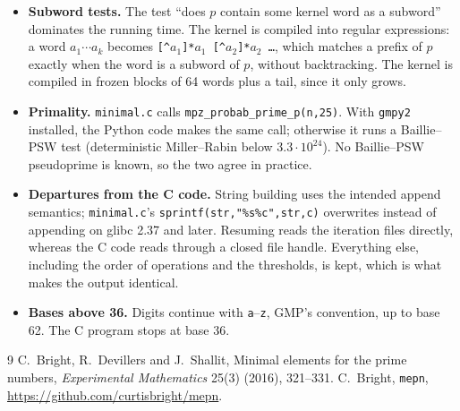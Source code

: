 \documentclass[11pt]{article}
\theoremstyle{definition}
\theoremstyle{remark}
\newcommand{\code}[1]{\texttt{#1}}
\begin{document}
\begin{itemize}
\item \textbf{Subword tests.} The test ``does $p$ contain some kernel word as a subword'' dominates the running time. The kernel is compiled into regular expressions: a word $a_1\cdots a_k$ becomes \code{[\^{}$a_1$]*$a_1$\,[\^{}$a_2$]*$a_2$\,\dots}, which matches a prefix of $p$ exactly when the word is a subword of $p$, without backtracking. The kernel is compiled in frozen blocks of 64 words plus a tail, since it only grows.
\item \textbf{Primality.} \code{minimal.c} calls \code{mpz\_probab\_prime\_p(n,25)}. With \code{gmpy2} installed, the Python code makes the same call; otherwise it runs a Baillie--PSW test (deterministic Miller--Rabin below $3.3\cdot10^{24}$). No Baillie--PSW pseudoprime is known, so the two agree in practice.
\item \textbf{Departures from the C code.} String building uses the intended append semantics; \code{minimal.c}'s \code{sprintf(str,"\%s\%c",str,c)} overwrites instead of appending on glibc 2.37 and later. Resuming reads the iteration files directly, whereas the C code reads through a closed file handle. Everything else, including the order of operations and the thresholds, is kept, which is what makes the output identical.
\item \textbf{Bases above 36.} Digits continue with \code{a}--\code{z}, GMP's convention, up to base 62. The C program stops at base 36.
\end{itemize}

\begin{thebibliography}{9}
 C.~Bright, R.~Devillers and J.~Shallit, Minimal elements for the prime numbers, \emph{Experimental Mathematics} 25(3) (2016), 321--331.
 C.~Bright, \code{mepn}, \url{https://github.com/curtisbright/mepn}.
\end{thebibliography}
\end{document}
